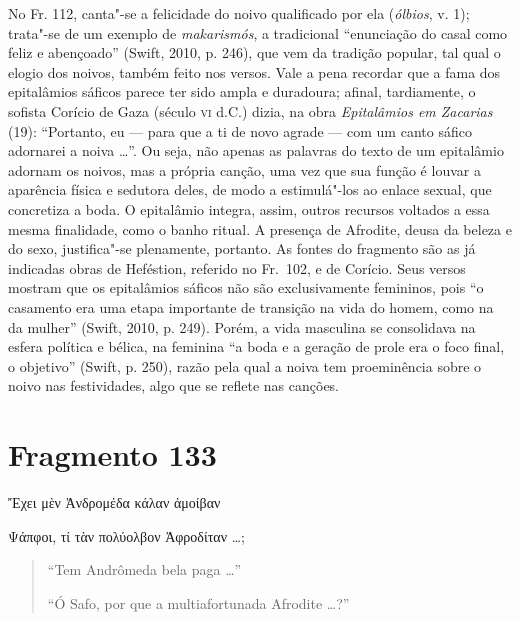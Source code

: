 No Fr. 112, canta"-se a felicidade do noivo qualificado por ela (\textit{ólbios}, v. 1); trata"-se de um exemplo de \textit{makarismós}, a tradicional “enunciação do casal como feliz e abençoado” (Swift, 2010, p. 246), que vem da tradição popular, tal qual o elogio dos noivos, também feito nos versos.
Vale a pena recordar que a fama dos epitalâmios sáficos parece ter
sido ampla e duradoura; afinal, tardiamente, o sofista Corício de Gaza (século
\textsc{vi} d.C.) dizia, na obra \textit{Epitalâmios em Zacarias} (19): ``Portanto, eu
--- para que a ti de novo agrade --- com um canto sáfico adornarei a noiva \ldots{}”.
Ou seja, não apenas as palavras do texto de um epitalâmio adornam os noivos,
mas a própria canção, uma vez que sua função é louvar a aparência física e
sedutora deles, de modo a estimulá"-los ao enlace sexual, que concretiza a
boda. O epitalâmio integra, assim, outros recursos voltados a essa mesma finalidade,
como o banho ritual. A presença de Afrodite, deusa da beleza e do sexo,
justifica"-se plenamente, portanto. As fontes do fragmento são as já indicadas
obras de Heféstion, referido no Fr.~102, e de Corício.
Seus versos mostram que os epitalâmios sáficos não são exclusivamente femininos, pois “o casamento era uma etapa importante de transição na vida do homem, como na da mulher” (Swift, 2010, p. 249). Porém, a vida masculina se consolidava na esfera política e bélica, na feminina  “a boda e a geração de prole era o foco final, o objetivo” (Swift, p. 250), razão pela qual a noiva tem proeminência sobre o noivo nas festividades, algo que se reflete nas canções.

\pagebreak

\section{Fragmento 133}

\begin{gkverse}
Ἔχει μὲν Ἀνδρομέδα κάλαν ἀμοίβαν

\ast\quad\ast\quad\ast

Ψάπφοι, τί τὰν πολύολβον Ἀφροδίταν \ldots;
\end{gkverse}

\begin{verse}
“Tem Andrômeda bela paga \ldots{}”

\ast\quad\ast\quad\ast

“Ó Safo, por que a multiafortunada Afrodite \ldots{}?”
\end{verse}

